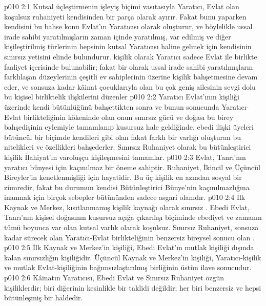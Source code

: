 \vs p010 2:1 Kutsal üçleştirmenin işleyiş biçimi vasıtasıyla Yaratıcı, Evlat olan koşulsuz ruhaniyeti kendisinden bir parça olarak ayırır. Fakat bunu yaparken kendisini bu bahse konu Evlat’ın Yaratıcısı olarak oluşturur, ve böylelikle ussal irade sahibi yaratılmışların zaman içinde yaratılmış, var edilmiş ve diğer kişileştirilmiş türlerinin hepsinin kutsal Yaratıcısı haline gelmek için kendisinin sınırsız yetisini elinde bulundurur.  kişilik olarak Yaratıcı sadece Evlat ile birlikte faaliyet içerisinde bulunabilir; fakat bir  olarak ussal irade sahibi yaratılmışların farklılaşan düzeylerinin çeşitli ev sahiplerinin üzerine kişilik bahşetmesine devam eder, ve sonsuza kadar kâinat çocuklarıyla olan bu çok geniş ailesinin sevgi dolu bu kişisel birliktelik ilişkilerini düzenler
\vs p010 2:2 Yaratıcı Evlat’ının kişiliği üzerinde kendi bütünlüğünü bahşettikten sonra ve bunun sonucunda Yaratıcı\hyp{}Evlat birlikteliğinin kökeninde olan onun sınırsız gücü ve doğası bu birey bahşedişinin eylemiyle tamamlanıp kusursuz hale geldiğinde, ebedi ilişki üyeleri bütüncül bir biçimde kendileri gibi olan fakat farklı bir varlığı oluşturan bu nitelikleri ve özellikleri bahşederler. Sınırsız Ruhaniyet olarak bu bütünleştirici kişilik İlahiyat’ın varoluşçu kişileşmesini tamamlar.
\vs p010 2:3 Evlat, Tanrı’nın yaratıcı bünyesi için kaçınılmaz bir öneme sahiptir. Ruhaniyet, İkincil ve Üçüncül Bireyler’in kenetlenmişliği için hayatidir. Bu üç kişilik en azından sosyal bir zümredir, fakat bu durumun kendisi Bütünleştirici Bünye’nin kaçınılmazlığına inanmak için birçok sebepler bütününden sadece asgari olanıdır.
\vs p010 2:4 İlk Kaynak ve Merkez, kısıtlanmamış kişilik kaynağı olarak sınırsız . Ebedi Evlat, Tanrı’nın kişisel doğasının kusursuz açığa çıkarılışı biçiminde ebediyet ve zamanın tümü boyunca var olan kutsal varlık olarak koşulsuz. Sınırsız Ruhaniyet, sonsuza kadar sürecek olan Yaratıcı\hyp{}Evlat birlikteliğinin benzersiz bireysel sonucu olan .
\vs p010 2:5 İlk Kaynak ve Merkez’in kişiliği, Ebedi Evlat’ın mutlak kişiliği dışında kalan sınırsızlığın kişiliğidir. Üçüncül Kaynak ve Merkez’in kişiliği, Yaratıcı\hyp{}kişilik ve mutlak Evlat\hyp{}kişiliğinin bağımsızlaştırılmış birliğinin üstün ilave sonucudur.
\vs p010 2:6 Kâinatın Yaratıcısı, Ebedi Evlat ve Sınırsız Ruhaniyet özgün kişiliklerdir; biri diğerinin kesinlikle bir taklidi değildir; her biri benzersiz ve hepsi bütünleşmiş bir haldedir.

